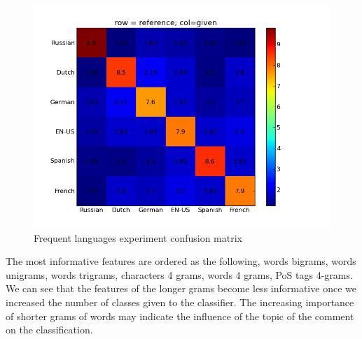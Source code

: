 \documentclass[11pt]{article}
\begin{document}
\begin{figure}[htp]
\centering
\includegraphics[scale=0.45]{popular_cfm.png}
\caption{Frequent languages experiment confusion matrix}
\label{pop_cfm}
\end{figure}

The most informative features are ordered as the following, words bigrams, words
unigrams, words trigrams, characters 4 grams, words 4 grams, PoS tags 4-grams.
We can see that the features of the longer grams become less informative once we
increased the number of classes given to the classifier. The increasing
importance of shorter grams of words may indicate the influence of the topic of the comment on the classification.
\end{document}
